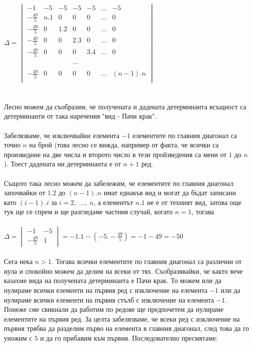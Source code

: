 \documentclass[a4paper, 12pt]{article}
\begin{document}
    $\Delta = \begin{vmatrix}
        -1 & -5 & -5 & -5 & -5 & \dots & -5\\
        -\frac{49}{5} & n.1 & 0 & 0 & 0 & \dots & 0\\
        -\frac{49}{5} & 0 & 1.2 & 0 & 0 & \dots & 0\\
        -\frac{49}{5} & 0 & 0 & 2.3 & 0 & \dots & 0\\
        -\frac{49}{5} & 0 & 0 & 0 & 3. 4 & \dots & 0\\
        \\
        ~ & ~ & ~ & \dots & ~ & ~ & ~\\
        \\
        -\frac{49}{5} & 0 & 0 & 0 & 0 & \dots & (n - 1).n\\
    \end{vmatrix}$ \\\\\\
    Лесно можем да съобразим, че получената и дадената детерминанта
    всъщност са детерминанти от така наречения "вид - Пачи крак". \\\\
    Забелязваме, че изключвайки елемента $-1$ елементите по главния диагонал
    са точно $n$ на брой (това лесно се вижда, например от факта, че всички
    са произведние на две числа и второто число в тези пройзведения са мени
    от $1$ до $n$). Тоест дадената ни детерминанта е от $n + 1$ ред. \\\\
    Същото така лесно можем да забележим, че елементите по главния диагонал
    започвайки от $1.2$ до $(n - 1).n$ имат еднакъв вид и могат да бъдат
    записани като $(i - 1).i$ за $i = 2, \; \dots, \; n$, а елементът $n.1$
    не е от техният вид, затова още тук ще се спрем и ще разгледаме частния
    случай, когато $n = 1$, тогава \\\\
    
    $\Delta = \begin{vmatrix}
        -1 & -5 \\
        -\frac{49}{5} & 1
    \end{vmatrix} = -1.1 - \left(-5.-\frac{49}{5}\right) = -1 - 49 = -50$ \\\\
    
    Сега нека $n > 1$. Тогава всички елементите по главния диагонал
    са различни от нула и спокойно можем да делим на всеки от тях.
    Съобразявайки, че както вече казахме вида на получената детерминанта е Пачи крак.
    То можем или да нулираме всички елементи на първия ред с изключение на елемента $-1$
    или да нулираме всички елементи на първия стълб с изключение на елемента $-1$.
    Понеже сме свикнали да работим по редове ще предпочетем да нулираме елементите
    на първия ред. За целта забелязваме, че всеки ред с изключение на първия трябва
    да разделим първо на елемента в главния диагонал, след това да го уножим с $5$
    и да го прибавим към първия. Последователно пресмятаме: \\\\ 
\end{document}
